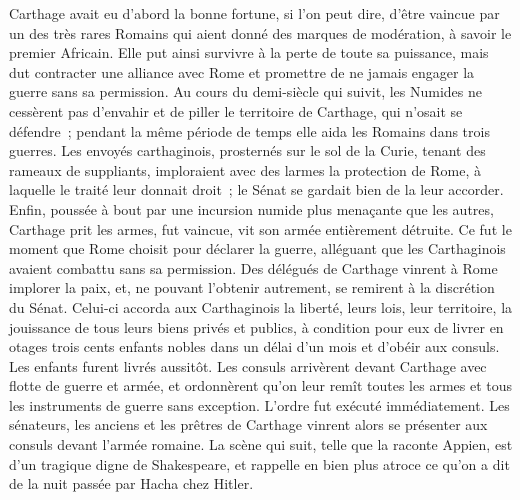 \documentclass[french,twoside]{book} %
\begin{document}
Carthage avait eu d'abord la bonne fortune, si l'on peut dire, d'être vaincue par un des très rares Romains qui aient donné des marques de modération, à savoir le premier Africain. Elle put ainsi survivre à la perte de toute sa puis­sance, mais dut contracter une alliance avec Rome et promettre de ne jamais engager la guerre sans sa permission. Au cours du demi-siècle qui suivit, les Numides ne cessèrent pas d'envahir et de piller le territoire de Carthage, qui n'osait se défendre ; pendant la même période de temps elle aida les Romains dans trois guerres. Les envoyés carthaginois, prosternés sur le sol de la Curie, tenant des rameaux de suppliants, imploraient avec des larmes la protection de Rome, à laquelle le traité leur donnait droit ; le Sénat se gardait bien de la leur accorder. Enfin, poussée à bout par une incursion numide plus menaçante que les autres, Carthage prit les armes, fut vaincue, vit son armée entièrement détruite. Ce fut le moment que Rome choisit pour déclarer la guerre, alléguant que les Carthaginois avaient combattu sans sa permission. Des délégués de Carthage vinrent à Rome implorer la paix, et, ne pouvant l'obtenir autrement, se remirent à la discrétion du Sénat. Celui-ci accorda aux Carthaginois la liberté, leurs lois, leur territoire, la jouissance de tous leurs biens privés et publics, à condition pour eux de livrer en otages trois cents enfants nobles dans un délai d'un mois et d'obéir aux consuls. Les enfants furent livrés aussi­tôt. Les consuls arrivèrent devant Carthage avec flotte de guerre et armée, et ordonnèrent qu'on leur remît toutes les armes et tous les instruments de guerre sans exception. L'ordre fut exécuté immédiatement. Les sénateurs, les anciens et les prêtres de Carthage vinrent alors se présenter aux consuls devant l'armée romaine. La scène qui suit, telle que la raconte Appien, est d'un tragique digne de Shakespeare, et rappelle en bien plus atroce ce qu'on a dit de la nuit passée par Hacha chez Hitler.\par
\end{document}
